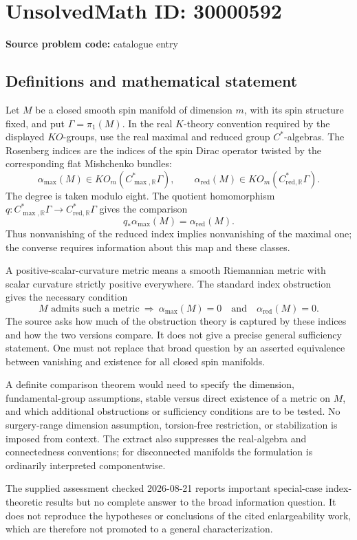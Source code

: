 \documentclass[11pt]{article}
\newcommand{\R}{\mathbb{R}}
\begin{document}
\section*{UnsolvedMath ID: 30000592}
\textbf{Source problem code:} catalogue entry
\subsection{Definitions and mathematical statement}
Let \(M\) be a closed smooth spin manifold of dimension \(m\), with its spin structure fixed, and put \(\Gamma=\pi_1(M)\). In the real \(K\)-theory convention required by the displayed \(KO\)-groups, use the real maximal and reduced group \(C^*\)-algebras. The Rosenberg indices are the indices of the spin Dirac operator twisted by the corresponding flat Mishchenko bundles:
\[
\alpha_{\max}(M)\in KO_m(C^*_{\max,\R}\Gamma),\qquad
\alpha_{\mathrm{red}}(M)\in KO_m(C^*_{\mathrm{red},\R}\Gamma).
\]
The degree is taken modulo eight. The quotient homomorphism \(q:C^*_{\max,\R}\Gamma\to C^*_{\mathrm{red},\R}\Gamma\) gives the comparison
\[
q_*\alpha_{\max}(M)=\alpha_{\mathrm{red}}(M).
\]
Thus nonvanishing of the reduced index implies nonvanishing of the maximal one; the converse requires information about this map and these classes.

A positive-scalar-curvature metric means a smooth Riemannian metric with scalar curvature strictly positive everywhere. The standard index obstruction gives the necessary condition
\[
M\text{ admits such a metric}\ \Longrightarrow\
\alpha_{\max}(M)=0\quad\text{and}\quad\alpha_{\mathrm{red}}(M)=0.
\]
The source asks how much of the obstruction theory is captured by these indices and how the two versions compare. It does not give a precise general sufficiency statement. One must not replace that broad question by an asserted equivalence between vanishing and existence for all closed spin manifolds.

A definite comparison theorem would need to specify the dimension, fundamental-group assumptions, stable versus direct existence of a metric on \(M\), and which additional obstructions or sufficiency conditions are to be tested. No surgery-range dimension assumption, torsion-free restriction, or stabilization is imposed from context. The extract also suppresses the real-algebra and connectedness conventions; for disconnected manifolds the formulation is ordinarily interpreted componentwise.

The supplied assessment checked 2026-08-21 reports important special-case index-theoretic results but no complete answer to the broad information question. It does not reproduce the hypotheses or conclusions of the cited enlargeability work, which are therefore not promoted to a general characterization.
\end{document}
